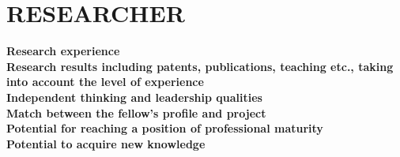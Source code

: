 \section{RESEARCHER} %
\label{sec:researcher}
\textbf{Research experience} \\
\textbf{Research results including patents, publications, teaching etc., taking into account the level 
of experience} \\
\textbf{Independent thinking and leadership qualities} \\
\textbf{Match between the fellow's profile and project} \\
\textbf{Potential for reaching a position of professional maturity} \\
\textbf{Potential to acquire new knowledge} \\

\newpage
